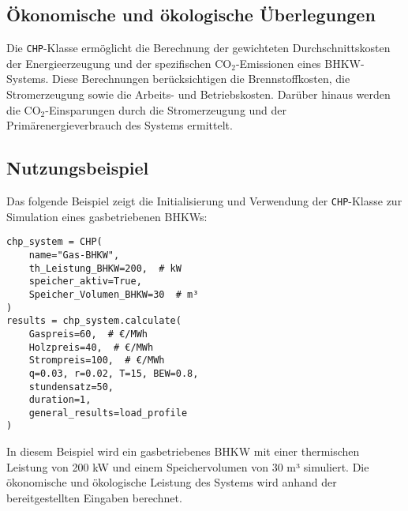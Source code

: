 \subsection{Ökonomische und ökologische Überlegungen}
Die \texttt{CHP}-Klasse ermöglicht die Berechnung der gewichteten Durchschnittskosten der Energieerzeugung und der spezifischen CO$_2$-Emissionen eines BHKW-Systems. Diese Berechnungen berücksichtigen die Brennstoffkosten, die Stromerzeugung sowie die Arbeits- und Betriebskosten. Darüber hinaus werden die CO$_2$-Einsparungen durch die Stromerzeugung und der Primärenergieverbrauch des Systems ermittelt.

\subsection{Nutzungsbeispiel}
Das folgende Beispiel zeigt die Initialisierung und Verwendung der \texttt{CHP}-Klasse zur Simulation eines gasbetriebenen BHKWs:

\begin{verbatim}
chp_system = CHP(
    name="Gas-BHKW", 
    th_Leistung_BHKW=200,  # kW
    speicher_aktiv=True,
    Speicher_Volumen_BHKW=30  # m³
)
results = chp_system.calculate(
    Gaspreis=60,  # €/MWh
    Holzpreis=40,  # €/MWh
    Strompreis=100,  # €/MWh
    q=0.03, r=0.02, T=15, BEW=0.8, 
    stundensatz=50, 
    duration=1, 
    general_results=load_profile
)
\end{verbatim}
In diesem Beispiel wird ein gasbetriebenes BHKW mit einer thermischen Leistung von 200 kW und einem Speichervolumen von 30 m³ simuliert. Die ökonomische und ökologische Leistung des Systems wird anhand der bereitgestellten Eingaben berechnet.
